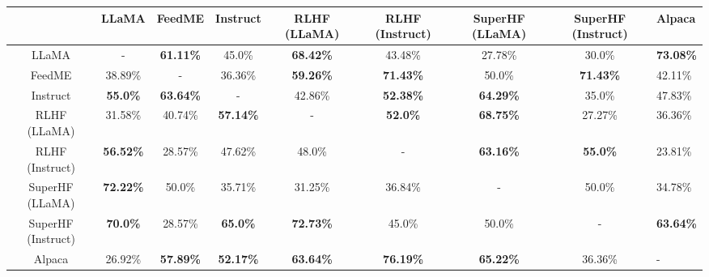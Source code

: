 \begin{tabular}{|c|c|c|c|c|c|c|c|}
\hline
 & LLaMA & FeedME & Instruct & RLHF (LLaMA) & RLHF (Instruct) & SuperHF (LLaMA) & SuperHF (Instruct) & Alpaca \\
\hline
LLaMA & - & \textbf{61.11\%} & 45.0\% & \textbf{68.42\%} & 43.48\% & 27.78\% & 30.0\% & \textbf{73.08\%} \\
\hline
FeedME & 38.89\% & - & 36.36\% & \textbf{59.26\%} & \textbf{71.43\%} & 50.0\% & \textbf{71.43\%} & 42.11\% \\
\hline
Instruct & \textbf{55.0\%} & \textbf{63.64\%} & - & 42.86\% & \textbf{52.38\%} & \textbf{64.29\%} & 35.0\% & 47.83\% \\
\hline
RLHF (LLaMA) & 31.58\% & 40.74\% & \textbf{57.14\%} & - & \textbf{52.0\%} & \textbf{68.75\%} & 27.27\% & 36.36\% \\
\hline
RLHF (Instruct) & \textbf{56.52\%} & 28.57\% & 47.62\% & 48.0\% & - & \textbf{63.16\%} & \textbf{55.0\%} & 23.81\% \\
\hline
SuperHF (LLaMA) & \textbf{72.22\%} & 50.0\% & 35.71\% & 31.25\% & 36.84\% & - & 50.0\% & 34.78\% \\
\hline
SuperHF (Instruct) & \textbf{70.0\%} & 28.57\% & \textbf{65.0\%} & \textbf{72.73\%} & 45.0\% & 50.0\% & - & \textbf{63.64\%} \\
\hline
Alpaca & 26.92\% & \textbf{57.89\%} & \textbf{52.17\%} & \textbf{63.64\%} & \textbf{76.19\%} & \textbf{65.22\%} & 36.36\% & - \\
\hline
\end{tabular}
